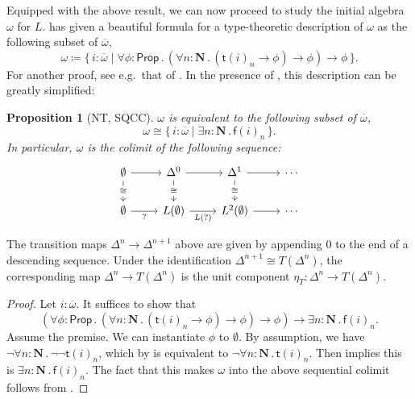 \documentclass[a4paper,12pt]{amsart}
\newtheorem{proposition}[theorem]{Proposition}
\theoremstyle{definition}
\newcommand{\mb}[1]{\mathbf{#1}}
\newcommand{\ms}[1]{\mathsf{#1}}
\newcommand{\ov}[1]{\overline{#1}}
\newcommand{\scomp}[2]{\{\,#1\mid#2\,\}}
\newcommand{\prth}[1]{\left(#1\right)}
\newcommand{\N}{\mb N}
\newcommand{\fa}[2]{\forall #1\!\colon\!\!#2\mathpunct{.}}
\newcommand{\ex}[2]{\exists #1\!\colon\!\!#2\mathpunct{.}}
\newcommand{\emp}{\emptyset}
\newcommand{\pp}{\ms{Prop}}
\newcommand\istsym{\ms{t}}
\newcommand\isfsym{\ms{f}}
\newcommand\ist[1]{\istsym(#1)}
\newcommand\isf[1]{\isfsym(#1)}
\begin{document}
Equipped with the above result, we can now proceed to study the initial algebra $\omega$ for $L$. \citet{JIBLADZE1997185} has given a beautiful formula for a type-theoretic description of $\omega$ as the following subset of $\ov\omega$, 
\[ \omega \coloneq \scomp{i : \ov\omega}{\fa\phi{\pp} (\fa n{\N} (\ist{i}_n \to \phi) \to \phi) \to \phi}\text{.} \]
For another proof, see e.g.\ that of \citet{VANOOSTEN2000233}. In the presence of , this description can be greatly simplified:

\begin{proposition}[NT, SQCC]\label{prop:omegacolimit}
  $\omega$ is equivalent to the following subset of $\ov\omega$,
  \[ \omega \cong \scomp{i : \ov\omega}{\ex n{\N} \isf{i}_n}\text{.} \]
  In particular, $\omega$ is the colimit of the following sequence:
    \[\begin{tikzcd}
    \emp & {\Delta^0} & {\Delta^1} & \cdots \\
    \emp & {L(\emp)} & {L^2(\emp)} & \cdots
    \arrow[from=1-1, to=1-2]
    \arrow["\cong"{description}, from=1-1, to=2-1]
    \arrow[from=1-2, to=1-3]
    \arrow["\cong"{description}, from=1-2, to=2-2]
    \arrow[from=1-3, to=1-4]
    \arrow["\cong"{description}, from=1-3, to=2-3]
    \arrow["{?}"', from=2-1, to=2-2]
    \arrow["{L(?)}"', from=2-2, to=2-3]
    \arrow[from=2-3, to=2-4]
  \end{tikzcd}\]
\end{proposition}

The transition maps $\Delta^n\to \Delta^{n+1}$ above are given by appending $0$ to the end of a descending sequence. Under the identification $\Delta^{n+1}\cong T(\Delta^n)$, the corresponding map $\Delta^n\to T(\Delta^n)$ is the unit component $\eta_T\colon \Delta^n\to T(\Delta^{n})$.

\begin{proof}
  Let $i : \ov\omega$. It suffices to show that
  \[ \prth{\fa\phi{\pp} (\fa n{\N} (\ist{i}_n \to \phi) \to \phi) \to \phi} \to \ex{n}\N \isf{i}_n\text{.} \]
  Assume the premise. We can instantiate $\phi$ to $\emp$. By assumption, we have $\neg\fa n\N \neg\neg\ist{i}_n$, which by  is equivalent to $\neg\fa n\N \ist{i}_n$. Then  implies this is $\ex n\N \isf{i}_n$. The fact that this makes $\omega$ into the above sequential colimit follows from \citet[Cor.~1.10]{VANOOSTEN2000233}.
\end{proof}
\end{document}
